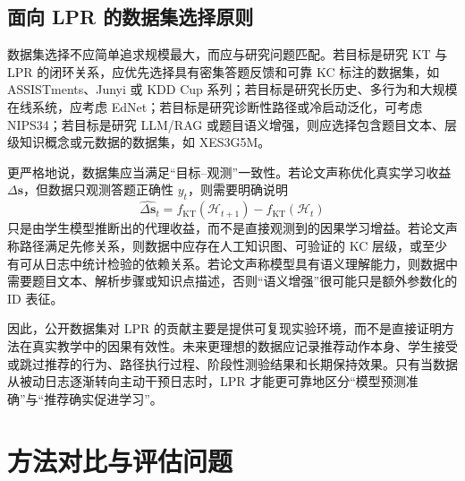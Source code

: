 \documentclass[UTF8,a4paper,zihao=-4]{ctexart}
\begin{document}
\subsection{面向 LPR 的数据集选择原则}

数据集选择不应简单追求规模最大，而应与研究问题匹配。若目标是研究 KT 与 LPR 的闭环关系，应优先选择具有密集答题反馈和可靠 KC 标注的数据集，如 ASSISTments、Junyi 或 KDD Cup 系列；若目标是研究长历史、多行为和大规模在线系统，应考虑 EdNet；若目标是研究诊断性路径或冷启动泛化，可考虑 NIPS34；若目标是研究 LLM/RAG 或题目语义增强，则应选择包含题目文本、层级知识概念或元数据的数据集，如 XES3G5M。

更严格地说，数据集应当满足“目标--观测”一致性。若论文声称优化真实学习收益 $\Delta \mathbf{s}$，但数据只观测答题正确性 $y_t$，则需要明确说明
\begin{equation}
\widehat{\Delta \mathbf{s}}_t=f_{\mathrm{KT}}(\mathcal{H}_{t+1})-f_{\mathrm{KT}}(\mathcal{H}_{t})
\end{equation}
只是由学生模型推断出的代理收益，而不是直接观测到的因果学习增益。若论文声称路径满足先修关系，则数据中应存在人工知识图、可验证的 KC 层级，或至少有可从日志中统计检验的依赖关系。若论文声称模型具有语义理解能力，则数据中需要题目文本、解析步骤或知识点描述，否则“语义增强”很可能只是额外参数化的 ID 表征。

因此，公开数据集对 LPR 的贡献主要是提供可复现实验环境，而不是直接证明方法在真实教学中的因果有效性。未来更理想的数据应记录推荐动作本身、学生接受或跳过推荐的行为、路径执行过程、阶段性测验结果和长期保持效果。只有当数据从被动日志逐渐转向主动干预日志时，LPR 才能更可靠地区分“模型预测准确”与“推荐确实促进学习”。

\section{方法对比与评估问题}
\end{document}
